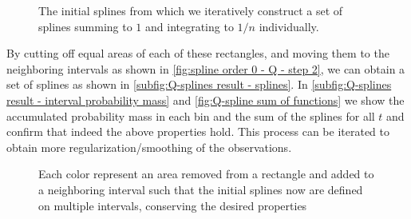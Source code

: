\documentclass[../Thesis.tex]{subfiles}
\begin{document}
\begin{figure}[H]
    \centering
    
    \caption{The initial splines from which we iteratively construct a set of splines summing to $1$ and integrating to $1/n$ individually.}
    \label{fig:spline order 0 - Q}
\end{figure}

By cutting off equal areas of each of these rectangles, and moving them to the neighboring intervals as shown in \autoref{fig:spline order 0 - Q - step 2}, we can obtain a set of splines as shown in \autoref{subfig:Q-splines result - splines}. In \autoref{subfig:Q-splines result - interval probability mass} and \autoref{fig:Q-spline sum of functions} we show the accumulated probability mass in each bin and the sum of the splines for all $t$ and confirm that indeed the above properties hold. This process can be iterated to obtain more regularization/smoothing of the observations.


\begin{figure}[H]
    \centering
    
    \caption{Each color represent an area removed from a rectangle and added to a neighboring interval such that the initial splines now are defined on multiple intervals, conserving the desired properties}
    \label{fig:spline order 0 - Q - step 2}
\end{figure}
\end{document}
